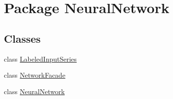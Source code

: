 \hypertarget{namespace_neural_network}{\section{Package Neural\-Network}
\label{namespace_neural_network}
}
\subsection*{Classes}
\begin{DoxyCompactItemize}
\item 
class \hyperlink{class_neural_network_1_1_labeled_input_series}{Labeled\-Input\-Series}
\item 
class \hyperlink{class_neural_network_1_1_network_facade}{Network\-Facade}
\item 
class \hyperlink{class_neural_network_1_1_neural_network}{Neural\-Network}
\end{DoxyCompactItemize}
